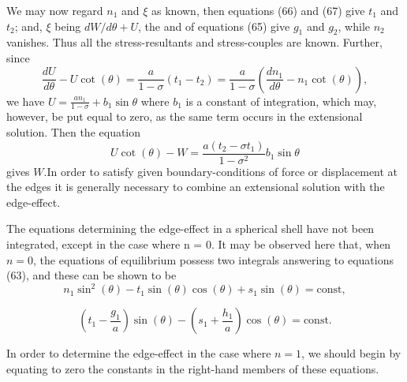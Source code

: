 We may now regard \(n_1\) and \(\xi \) as known,
then equations (66) and (67) give \(t_1\) and
\(t_2\); and, \(\xi \) being \(dW/d\theta + U\),
the  and  of equations (65) give \(g_1\) and \(g_2\),
while \(n_2\) vanishes. Thus all the stress-resultants and
stress-couples are known.  Further, since
\[
\frac{dU}{d\theta} -U \cot(\theta)=\frac{a}{1-\sigma}(t_1-t_2)=
\frac{a}{1-\sigma}\left(\frac{d n_1}{d\theta} - n_1 \cot(\theta) \right),
\]
we have
\(U =\frac{a n_1}{1 - \sigma}+ b_1 \sin \theta \)
where \(b_1\) is a constant of integration, which may, however, be put equal to
zero, as the same term occurs in the extensional solution. Then the equation
\[
U \cot(\theta) -W= \frac{a (t_2 - \sigma t_1)}{1 - \sigma^2} b_1 \sin \theta
\]
gives \(W\).In order to satisfy given boundary-conditions of
force or displacement at the edges it is generally necessary to combine an
extensional solution with the edge-effect.

The equations determining the edge-effect in a spherical shell have not been
integrated, except in the case where n = 0. It may be observed here that, when
\(n=0\), the equations of equilibrium possess two integrals answering to
equations (63), and these can be shown to be
\[
n_1 \sin^2(\theta) -t_1 \sin (\theta) \cos (\theta) +
s_1 \sin (\theta) = \text{const},
\]

\[
\left(t_1 - \frac{g_1}{a} \right)\sin (\theta) -
\left(s_1 + \frac{h_1}{a} \right)\cos (\theta) = \text{const}.
\]

In order to determine the edge-effect in the case where \(n=1\), we should
begin by equating to zero the constants in the right-hand members of these equations.

